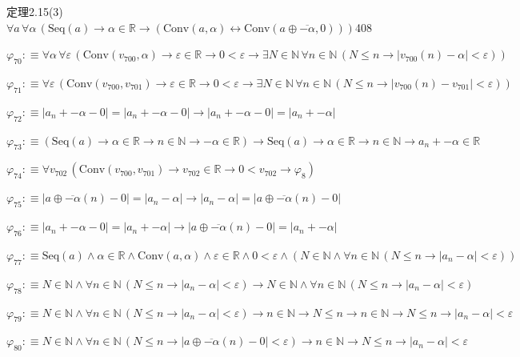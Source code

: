 \begin{fullproof}{定理2.15(3)}{$\forall a\,\forall \alpha\,(\mathrm{Seq}(a) \to \alpha \in \mathbb{R} \to (\mathrm{Conv}(a,\alpha) \leftrightarrow \mathrm{Conv}(a \oplus \overline{-\alpha},0)))$}{408}
\begin{abbrevlist}
\item $\varphi_{70} :\equiv \forall \alpha\,\forall \varepsilon\,(\mathrm{Conv}(v_{700},\alpha) \to \varepsilon \in \mathbb{R} \to 0 < \varepsilon \to \exists N \in \mathbb{N}\,\forall n \in \mathbb{N}\,(N \leq n \to \lvert v_{700}(n) - \alpha \rvert < \varepsilon))$
\item $\varphi_{71} :\equiv \forall \varepsilon\,(\mathrm{Conv}(v_{700},v_{701}) \to \varepsilon \in \mathbb{R} \to 0 < \varepsilon \to \exists N \in \mathbb{N}\,\forall n \in \mathbb{N}\,(N \leq n \to \lvert v_{700}(n) - v_{701} \rvert < \varepsilon))$
\item $\varphi_{72} :\equiv \lvert a_{n} + -\alpha - 0 \rvert = \lvert a_{n} + -\alpha - 0 \rvert \to \lvert a_{n} + -\alpha - 0 \rvert = \lvert a_{n} + -\alpha \rvert$
\item $\varphi_{73} :\equiv (\mathrm{Seq}(a) \to \alpha \in \mathbb{R} \to n \in \mathbb{N} \to -\alpha \in \mathbb{R}) \to \mathrm{Seq}(a) \to \alpha \in \mathbb{R} \to n \in \mathbb{N} \to a_{n} + -\alpha \in \mathbb{R}$
\item $\varphi_{74} :\equiv \forall v_{702}\,(\mathrm{Conv}(v_{700},v_{701}) \to v_{702} \in \mathbb{R} \to 0 < v_{702} \to \varphi_{8})$
\item $\varphi_{75} :\equiv \lvert a \oplus \overline{-\alpha}(n) - 0 \rvert = \lvert a_{n} - \alpha \rvert \to \lvert a_{n} - \alpha \rvert = \lvert a \oplus \overline{-\alpha}(n) - 0 \rvert$
\item $\varphi_{76} :\equiv \lvert a_{n} + -\alpha - 0 \rvert = \lvert a_{n} + -\alpha \rvert \to \lvert a \oplus \overline{-\alpha}(n) - 0 \rvert = \lvert a_{n} + -\alpha \rvert$
\item $\varphi_{77} :\equiv \mathrm{Seq}(a) \land \alpha \in \mathbb{R} \land \mathrm{Conv}(a,\alpha) \land \varepsilon \in \mathbb{R} \land 0 < \varepsilon \land (N \in \mathbb{N} \land \forall n \in \mathbb{N}\,(N \leq n \to \lvert a_{n} - \alpha \rvert < \varepsilon))$
\item $\varphi_{78} :\equiv N \in \mathbb{N} \land \forall n \in \mathbb{N}\,(N \leq n \to \lvert a_{n} - \alpha \rvert < \varepsilon) \to N \in \mathbb{N} \land \forall n \in \mathbb{N}\,(N \leq n \to \lvert a_{n} - \alpha \rvert < \varepsilon)$
\item $\varphi_{79} :\equiv N \in \mathbb{N} \land \forall n \in \mathbb{N}\,(N \leq n \to \lvert a_{n} - \alpha \rvert < \varepsilon) \to n \in \mathbb{N} \to N \leq n \to n \in \mathbb{N} \to N \leq n \to \lvert a_{n} - \alpha \rvert < \varepsilon$
\item $\varphi_{80} :\equiv N \in \mathbb{N} \land \forall n \in \mathbb{N}\,(N \leq n \to \lvert a \oplus \overline{-\alpha}(n) - 0 \rvert < \varepsilon) \to n \in \mathbb{N} \to N \leq n \to \lvert a_{n} - \alpha \rvert < \varepsilon$

\end{abbrevlist}
\end{fullproof}
